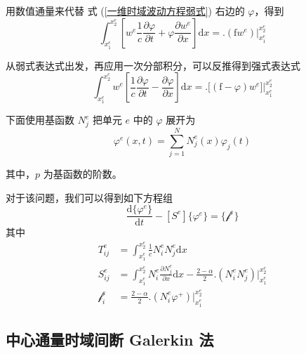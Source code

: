 \par 用数值通量来代替
式 (\ref{一维时域波动方程弱式}) 右边的 $\varphi$，得到
\begin{equation}
    \int_{x_1^e}^{x_2^e}\left[
        w^e\frac{1}{c}\frac{\partial \varphi}{\partial t}
        +\varphi\frac{\partial w^e}{\partial x}
    \right]\text{d}x
    =\Big.(\text{f} w^e)\Big|_{x_1^e}^{x_2^e}
\end{equation}
\par 从弱式表达式出发，再应用一次分部积分，可以反推得到强式表达式
\begin{equation}
    \int_{x_1^e}^{x_2^e}w^e\left[
        \frac{1}{c}\frac{\partial \varphi}{\partial t}
        -\frac{\partial \varphi}{\partial x}
    \right]\text{d}x
    =\Big.\big[(\text{f}-\varphi) w^e\big]\Big|_{x_1^e}^{x_2^e}
\end{equation}
\par 下面使用基函数 $N_j^e$ 把单元 $e$ 中的 $\varphi$ 展开为
\begin{equation}
    \varphi^e(x,t)=\sum_{j=1}^{N}N_j^e(x)\varphi_j(t)
\end{equation}
\par 其中，$p$ 为基函数的阶数。

\begin{theorem}
    对于该问题，我们可以得到如下方程组
    \begin{equation}
        [T^e]\frac{\text{d}\{\varphi^e\}}{\text{d}t}
        -[S^e]\{\varphi^e\}
        =\{\mathscr{f}^e\}
    \end{equation}
    其中
    \begin{align}
        T_{ij}^e&=
        \int_{x_1^e}^{x_2^e}
        \frac{1}{c}N_i^eN_j^e\text{d}x\\
        S_{ij}^e&=
        \int_{x_1^e}^{x_2^e}
        N_i^e\frac{\partial N_j^e}{\partial x}
        \text{d}x-\frac{2-\alpha}{2}
        \Big.(N_i^e N_j^e)\Big|_{x_1^e}^{x_2^e}\\
        \mathscr{f}_i^e&=
        \frac{2-\alpha}{2}\Big.(N_i^e\varphi^+)\Big|_{x_1^e}^{x_2^e}
    \end{align}
\end{theorem}

\subsection{中心通量时域间断 Galerkin 法}

